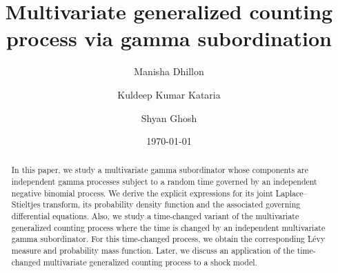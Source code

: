 \documentclass[12pt,oneside,reqno]{amsart}
\numberwithin{equation}{section}
\theoremstyle{definition}
\numberwithin{equation}{section}
\theoremstyle{remarkstyle}
\begin{document}
\title{Multivariate generalized counting process via gamma subordination}

\author[Manisha Dhillon]{Manisha Dhillon}
\address{Manisha Dhillon, Department of Mathematics, Indian Institute of Technology Bhilai, Durg, 491002, India.}
\author[Kuldeep Kumar Kataria]{Kuldeep Kumar Kataria}
\address{Kuldeep Kumar Kataria, Department of Mathematics, Indian Institute of Technology Bhilai, Durg, 491002, India.}
\author[Shyan Ghosh]{Shyan Ghosh}
\address{Shyan Ghosh, Department of Mathematics, Indian Institute of Technology Bhilai, Durg, 491002, India.}


\date{\today}

\begin{abstract}
In this paper, we study a multivariate gamma subordinator whose components are independent gamma processes subject to a random time governed by an independent negative binomial process. We derive the explicit expressions for its joint Laplace–Stieltjes transform, its probability density function and the associated governing differential equations. Also, we study a time-changed variant of the multivariate generalized counting process where the time is changed by an independent multivariate gamma subordinator. For this time-changed process, we obtain the corresponding Lévy measure and probability mass function. Later, we discuss an application of the time-changed multivariate generalized counting process to a shock model.
\end{abstract}

\maketitle
\end{document}
